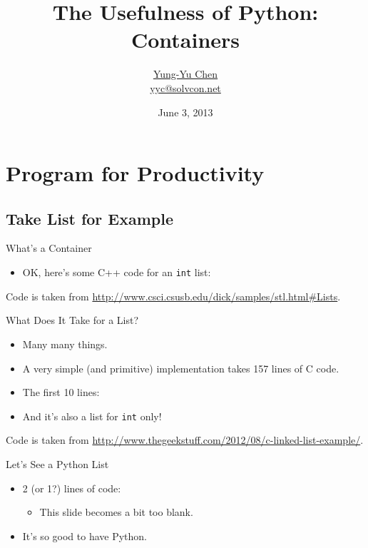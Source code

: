 \documentclass[dvips,xcolor=pst,14pt]{beamer}
\title[Containers]{The Usefulness of Python: Containers}
\author[\href{http://solvcon.net/yyc/}{Yung-Yu Chen}]%
{\href{http://solvcon.net/yyc/}{Yung-Yu Chen} \\ {\scriptsize
\url{yyc@solvcon.net}}}
\institute[PyHUG]{Python Hsinchu User Group}
\date[2013/6/3]{June 3, 2013}
\begin{document}
\begin{frame}
\titlepage
\end{frame}


\section{
Program for Productivity
}

\subsection{
Take List for Example
}

\begin{frame}[fragile]{
%
What's a Container
%
}
\begin{itemize}
\item OK, here's some C++ code for an \verb+int+ list:
  
\end{itemize}

\begin{flushleft}\tiny Code is taken from
\url{http://www.csci.csusb.edu/dick/samples/stl.html#Lists}.
\end{flushleft}
\end{frame}

\begin{frame}[fragile]{
%
What Does It Take for a List?
%
}
\begin{itemize}
\item Many many things.
\item A very simple (and primitive) implementation takes 157 lines of C code.
\item The first 10 lines:
  
\item And it's also a list for \verb+int+ only!
\end{itemize}

\begin{flushleft}\tiny Code is taken from
\url{http://www.thegeekstuff.com/2012/08/c-linked-list-example/}.
\end{flushleft}
\end{frame}

\begin{frame}[fragile]{
%
Let's See a Python List
%
}
\begin{itemize}
\item 2 (or 1?) lines of code:
  
  \begin{itemize}
  \item This slide becomes a bit too blank.
  \end{itemize}
\item It's so good to have Python.
\end{itemize}
\end{frame}
\end{document}
